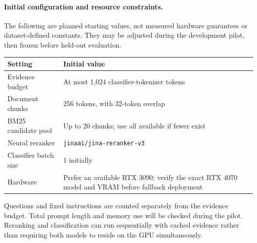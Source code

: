 \paragraph{Initial configuration and resource constraints.}
The following are planned starting values, not measured hardware guarantees or dataset-defined constants. They may be adjusted during the development pilot, then frozen before held-out evaluation.
\begin{center}
\small
\begin{tabularx}{\linewidth}{@{}lX@{}}
\toprule
Setting & Initial value \\
\midrule
Evidence budget & At most 1,024 classifier-tokenizer tokens \\
Document chunks & 256 tokens, with 32-token overlap \\
BM25 candidate pool & Up to 20 chunks; use all available if fewer exist \\
Neural reranker & \texttt{jinaai/jina-reranker-v3} \\
Classifier batch size & 1 initially \\
Hardware & Prefer an available RTX 3090; verify the exact RTX 4070 model and VRAM before fallback deployment \\
\bottomrule
\end{tabularx}
\end{center}
Questions and fixed instructions are counted separately from the evidence budget. Total prompt length and memory use will be checked during the pilot. Reranking and classification can run sequentially with cached evidence rather than requiring both models to reside on the GPU simultaneously.
